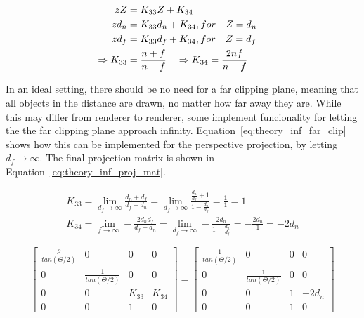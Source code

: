 \begin{equation}
    \begin{aligned}
        zZ &= K_{33} Z + K_{34} &\\
        zd_n &= K_{33} d_n + K_{34} \hfill, for \quad Z = d_n \\
        zd_f &= K_{33} d_f + K_{34} \hfill, for \quad Z = d_f \\
        \Rightarrow K_{33} &= \frac{n+f}{n-f} \quad \Rightarrow K_{34} = \frac{2nf}{n-f}
    \end{aligned}
    \label{eq:perspective_zeqs}
\end{equation}

In an ideal setting, there should be no need for a far clipping plane, meaning that all objects in the distance are drawn, no matter how far away they are. While this may differ from renderer to renderer, some implement funcionality for letting the the far clipping plane approach infinity. Equation~\eqref{eq:theory_inf_far_clip} shows how this can be implemented for the perspective projection, by letting $d_f \rightarrow \infty$. The final projection matrix is shown in Equation~\eqref{eq:theory_inf_proj_mat}.

\begin{equation}
    \begin{aligned}
    K_{33} = \lim_{d_f \rightarrow \infty} \frac{d_n+d_f}{d_f-d_n} =
    \lim_{d_f \rightarrow \infty} \frac{\frac{d_n}{d_f}+1}{1-\frac{d_n}{d_f}} = 
    \frac{1}{1} = 1 \\
    K_{34} = \lim_{f \rightarrow \infty} -\frac{2d_n d_f}{d_f-d_n} = 
    \lim_{d_f \rightarrow \infty} -\frac{2d_n}{1-\frac{d_n}{d_f}} =
    -\frac{2d_n}{1} = -2d_n
    \end{aligned}
    \label{eq:theory_inf_far_clip}
\end{equation}

\begin{equation}
    \begin{bmatrix}
        \frac{\rho}{tan(\Theta/2)} & 0 & 0 & 0 \\
        0 & \frac{1}{tan(\Theta/2)} & 0 & 0 \\
        0 & 0 & K_{33} & K_{34} \\
        0 & 0 & 1 & 0 
    \end{bmatrix} = \begin{bmatrix}
        \frac{1}{tan(\Theta/2)} & 0 & 0 & 0 \\
        0 & \frac{1}{tan(\Theta/2)} & 0 & 0 \\
        0 & 0 & 1 & -2d_n \\
        0 & 0 & 1 & 0 
    \end{bmatrix}
    \label{eq:theory_inf_proj_mat}
\end{equation}


